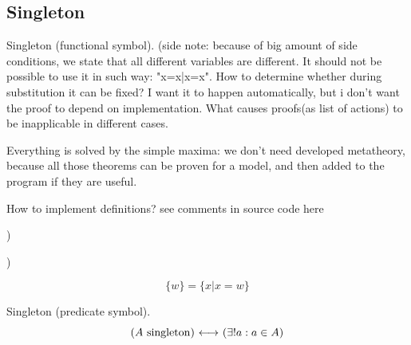 \subsection{Singleton}
\begin{definition} Singleton (functional symbol).
(side note: because of big amount of side conditions, we state that all different variables are different. 
It should not be possible to use it in such way: "{x}={x|x=x}".
How to determine whether during substitution it can be fixed?
I want it to happen automatically, but i don't want the proof to depend on implementation.
What causes proofs(as list of actions) to be inapplicable in different cases.

Everything is solved by the simple maxima: we don't need developed metatheory, because all those theorems can be proven for a model, and then added to the program if they are useful.

How to implement definitions? see comments in source code here





)

)



\[
\{w\} = \{x|x=w\}
\]
\end{definition}

\begin{definition} Singleton (predicate symbol).
\[
(A\mathrm{\ singleton}) {\ \longleftrightarrow\ } (\exists!a:a\in A)
\]
\end{definition}
